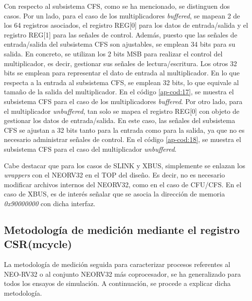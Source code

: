 Con respecto al subsistema CFS, como se ha mencionado, se distinguen dos casos. 
Por un lado, para el caso de los multiplicadores \textit{buffered}, se mapean 2 de los 64 registros asociados, el registro REG[0] para los datos de entrada/salida y el registro REG[1] para las señales de control.
Además, puesto que las señales de entrada/salida del subsistema CFS son ajustables, se emplean 34 bits para su salida.
En concreto, se utilizan los 2 bits MSB para realizar el control del multiplicador, es decir, gestionar sus señales de lectura/escritura.
Los otros 32 bits se emplean para representar el dato de entrada al multiplicador.
En lo que respecta a la entrada al subsistema CFS, se emplean 32 bits, lo que equivale al tamaño de la salida del multiplicador.
En el código \ref{ap-cod:17}, se muestra el subsistema CFS para el caso de los multiplicadores \textit{buffered}.
Por otro lado, para el multiplicador \textit{unbuffered}, tan solo se mapea el registro REG[0] con objeto de gestionar los datos de entrada/salida.
En este caso, las señales del subsistema CFS se ajustan a 32 bits tanto para la entrada como para la salida, ya que no es necesario administrar señales de control.
En el código \ref{ap-cod:18}, se muestra el subsistema CFS para el caso del multiplicador \textit{unbuffered}.

Cabe destacar que para los casos de SLINK y XBUS, simplemente se enlazan los \textit{wrappers} con el NEORV32 en el TOP del diseño. 
Es decir, no es necesario modificar archivos internos del NEORV32, como en el caso de CFU/CFS.
En el caso de XBUS, es de interés señalar que se asocia la dirección de memoria \textit{0x90000000} con dicha interfaz. 

\subsection{Metodología de medición mediante el registro CSR(mcycle)}

\label{met}



La metodología de medición seguida para caracterizar procesos referentes al NEO-RV32 o al conjunto NEORV32 más coprocesador, se ha generalizado para todos los ensayos de simulación.
A continuación, se procede a explicar dicha metodología.

